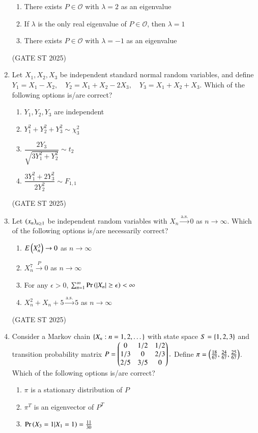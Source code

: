 \documentclass[journal,12pt,onecolumn]{IEEEtran}
\theoremstyle{remark}
\begin{document}
\begin{enumerate}
\begin{enumerate}
\item There exists $P \in \mathcal{O}$ with $\lambda=2$ as an eigenvalue
\item If $\lambda$ is the only real eigenvalue of $P \in \mathcal{O}$, then $\lambda=1$
\item There exists $P \in \mathcal{O}$ with $\lambda=-1$ as an eigenvalue
\end{enumerate}
\hfill{(GATE ST 2025)}
\item Let $X_1,X_2,X_3$ be independent standard normal random variables, and define
$
Y_1=X_1-X_2, \quad Y_2=X_1+X_2-2X_3, \quad Y_3=X_1+X_2+X_3.
$
Which of the following options is/are correct?
\begin{enumerate}
\item $Y_1,Y_2,Y_3$ are independent
\item $Y_1^2+Y_2^2+Y_3^2 \sim \chi^2_3$
\item $\dfrac{2Y_3}{\sqrt{3Y_1^2+Y_2^2}} \sim t_2$
\item $\dfrac{3Y_1^2+2Y_3^2}{2Y_2^2} \sim F_{1,1}$
\end{enumerate}
\hfill{(GATE ST 2025)}
\item Let $\left(x_n\right)_{n\geq 1}$ be independent random variables with $X_n \xrightarrow{\text{a.s.}} 0$ as $n \to \infty$.  
Which of the following options is/are necessarily correct?
\begin{enumerate}
\item $E\left(X_n^3\right) \to 0$ as $n\to\infty$
\item $X_n^7 \xrightarrow{P} 0$ as $n\to\infty$
\item For any $\epsilon>0$, $\sum_{n=1}^\infty \Pr\left(|X_n|\geq \epsilon\right)<\infty$
\item $X_n^2+X_n+5 \xrightarrow{\text{a.s.}} 5$ as $n\to\infty$
\end{enumerate}
\hfill{(GATE ST 2025)}
\item Consider a Markov chain $\left\{X_n:n=1,2,\dots\right\}$ with state space $S=\left\{1,2,3\right\}$ and transition probability matrix
$
P=\begin{pmatrix}
0 & 1/2 & 1/2 \\
1/3 & 0 & 2/3 \\
2/5 & 3/5 & 0
\end{pmatrix}.
$
Define $\pi=\left(\tfrac{18}{67},\tfrac{24}{67},\tfrac{25}{67}\right)$. Which of the following options is/are correct?
\begin{enumerate}
\item $\pi$ is a stationary distribution of $P$
\item $\pi^T$ is an eigenvector of $P^T$
\item $\Pr\left(X_3=1|X_1=1\right)=\tfrac{11}{30}$

\end{enumerate}
\end{enumerate}
\end{document}

